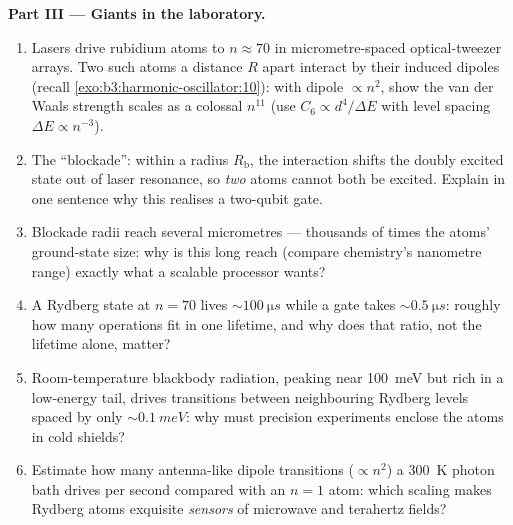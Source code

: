 \begin{problem}
\medskip\noindent\textbf{Part III --- Giants in the laboratory.}
\begin{enumerate}[resume]
  \item Lasers drive rubidium atoms to $n \approx 70$ in
        micrometre-spaced optical-tweezer arrays. Two such atoms a
        distance $R$ apart interact by their induced dipoles
        (recall \cref{exo:b3:harmonic-oscillator:10}): with dipole
        $\propto n^2$, show the van der Waals strength scales as a
        colossal $n^{11}$ (use $C_6 \propto d^4/\Delta E$ with
        level spacing $\Delta E \propto n^{-3}$).
  \item The ``blockade'': within a radius $R_{\text{b}}$, the
        interaction shifts the doubly excited state out of laser
        resonance, so \emph{two} atoms cannot both be excited.
        Explain in one sentence why this realises a two-qubit
        gate.
  \item Blockade radii reach several micrometres --- thousands of
        times the atoms' ground-state size: why is this
        long reach (compare chemistry's nanometre range)
        exactly what a scalable processor wants?
  \item A Rydberg state at $n = 70$ lives $\sim\qty{100}{\micro s}$
        while a gate takes $\sim\qty{0.5}{\micro s}$: roughly how
        many operations fit in one lifetime, and why does that
        ratio, not the lifetime alone, matter?
  \item Room-temperature blackbody radiation, peaking near
        \qty{100}{meV} but rich in a low-energy tail, drives
        transitions between neighbouring Rydberg levels spaced by
        only $\sim\qty{0.1}{meV}$: why must precision experiments
        enclose the atoms in cold shields?
  \item Estimate how many antenna-like dipole transitions
        ($\propto n^2$) a \qty{300}{K} photon bath drives per
        second compared with an $n = 1$ atom: which scaling makes
        Rydberg atoms exquisite \emph{sensors} of microwave and
        terahertz fields?
\end{enumerate}


\end{problem}
